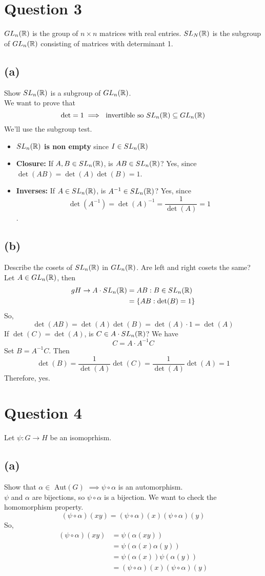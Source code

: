 \documentclass[openany]{report}
\begin{document}
\section{Question 3}
$GL_n(\mathbb{R})$ is the group of $n \times n$ matrices with real entries. $SL_N(\mathbb{R})$ is the subgroup of $GL_n(\mathbb{R})$ consisting of matrices with determinant 1.
\subsection{(a)}
Show $SL_n(\mathbb{R})$ is a subgroup of $GL_n(\mathbb{R})$.\\[2ex]
We want to prove that 
\[\text{det} = 1 \implies \text{ invertible so } SL_n(\mathbb{R}) \subseteq GL_n(\mathbb{R})\]
We'll use the subgroup test. 
\begin{itemize}
    \item \textbf{$SL_n(\mathbb{R})$ is non empty} since $I \in SL_n(\mathbb{R})$
    \item \textbf{Closure:} If $A,B \in SL_n(\mathbb{R})$, is $AB \in SL_n(\mathbb{R})$? Yes, since $\det(AB) = \det(A)\det(B) = 1$. 
    \item \textbf{Inverses: } If $A \in SL_n(\mathbb{R})$, is $A^{-1} \in SL_n(\mathbb{R})$? Yes, since 
    $$\det(A^{-1}) = \det(A)^{-1} = \frac{1}{\det(A)} = 1$$.
\end{itemize}
\subsection{(b)}
Describe the cosets of $SL_n(\mathbb{R})$ in $GL_n(\mathbb{R})$. Are left and right cosets the same?\\[2ex]
Let $A\in GL_n(\mathbb{R})$, then 
\begin{align*}
    gH \rightarrow A \cdot SL_n(\mathbb{R}) &= AB : B \in SL_n(\mathbb{R})\\
    &= \{AB: \det(B) = 1\}
\end{align*}
So, 
\[\det(AB) = \det(A)\det(B) = \det(A)\cdot 1 = \det(A)\]
If $\det(C) = \det(A)$, is $C \in A \cdot SL_n(\mathbb{R})$? We have 
\[C = A \cdot A^{-1}C\]
Set $B = A^{-1}C$. Then
\[\det(B) = \frac{1}{\det(A)} \det(C) = \frac{1}{\det(A)} \det(A) = 1\]
Therefore, yes.
\section{Question 4}
Let $\psi: G \rightarrow H$ be an isomoprhism. 
\subsection{(a)}
Show that $\alpha \in$ Aut$(G)$ $\implies \psi \circ \alpha$ is an automorphism. \\[2ex]
$\psi$ and $\alpha$ are bijections, so $\psi \circ \alpha$ is a bijection. We want to check the homomorphism property.
\[(\psi \circ \alpha) (xy) = (\psi \circ \alpha)(x)(\psi \circ \alpha)(y)\]
So,
\begin{align*}
    (\psi \circ \alpha)(xy) &= \psi(\alpha(xy))\\
    &= \psi(\alpha(x)\alpha(y))\\
    &= \psi(\alpha(x))\psi(\alpha(y))\\
    &= (\psi \circ \alpha)(x)(\psi \circ \alpha)(y)
\end{align*}
\end{document}

